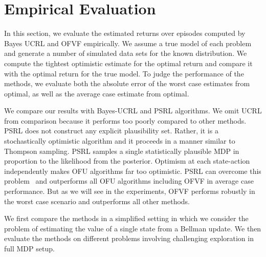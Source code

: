 \documentclass{article}
\theoremstyle{plain}
\theoremstyle{definition}
\begin{document}
\section{Empirical Evaluation} \label{sec:experiments}

In this section, we evaluate the estimated returns over episodes
computed by Bayes UCRL and OFVF empirically. We assume a true model of
each problem and generate a number of simulated data sets for the
known distribution. We compute the tightest optimistic estimate for
the optimal return and compare it with the optimal return for the true
model. To judge the performance of the methods, we evaluate both the
absolute error of the worst case estimates from optimal, as well as the
average case estimate from optimal.

We compare our results with Bayes-UCRL and PSRL algorithms. We omit UCRL from comparison because it performs too poorly compared to other methods. PSRL does not construct any explicit plausibility set. Rather, it is a stochastically optimistic algorithm and it proceeds in a manner similar to Thompson sampling. PSRL samples a single statistically plausible MDP in proportion to the likelihood from the posterior. Optimism at each state-action independently makes OFU algorithms far too optimistic. PSRL can overcome this problem~\cite{Osband2016} and outperforms all OFU algorithms including OFVF in average case performance. But as we will see in the experiments, OFVF performs robustly in the worst case scenario and outperforms all other methods.

We first compare the methods in a simplified setting in which we
consider the problem of estimating the value of a single state from a
Bellman update. We then evaluate the methods on different problems
involving challenging exploration in full MDP setup.
\end{document}
